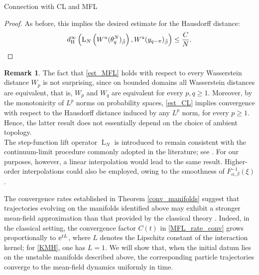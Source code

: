 \documentclass{article}
\theoremstyle{definition}
\newtheorem{rk}{Remark}[section]
\newcommand{\e}{\textnormal{e}}
\renewcommand{\u}{\textnormal{u}}
\renewcommand{\L}{\operatorname{L}}
\renewcommand{\H}{\operatorname{H}}
\begin{document}
\begin{section}{Connection with CL and MFL}
\begin{proof}
As before, this implies the desired estimate for the Hausdorff distance:
$$d_{\H}^{\infty}\left(\L_N\left(W^u(\theta^N_q)_{\Tilde{\beta}}\right),W^\u(y_{q-\pi})_{\Tilde{\beta}}\right)\leq\frac{C}{N}.$$
\end{proof}
\begin{rk} The fact that \eqref{est_MFL} holds with respect to every Wasserstein distance $W_p$ is not surprising, since on bounded domains all Wasserstein distances are equivalent, that is, $W_p$ and $W_q$ are equivalent for every $p,q\geq 1$. Moreover, by the monotonicity of $L^p$ norms on probability spaces, \eqref{est_CL} implies convergence with respect to the Hausdorff distance induced by any $L^p$ norm, for every $p\geq 1$. Hence, the latter result does not essentially depend on the choice of ambient topology.\\

The step-function lift operator $\operatorname{L}_N$ is introduced to remain consistent with the continuum-limit procedure commonly adopted in the literature; see \cite{medvedev2014nonlinear}. For our purposes, however, a linear interpolation would lead to the same result. Higher-order interpolations could also be employed, owing to the smoothness of $F^{-1}_{\alpha,\beta}(\xi)$.
\end{rk}
The convergence rates established in Theorem \ref{conv_manifolds} suggest that trajectories evolving on the manifolds identified above may exhibit a stronger mean-field approximation than that provided by the classical theory \cite{golse2016dynamics}. Indeed, in the classical setting, the convergence factor $C(t)$ in \eqref{MFL_rate_conv} grows proportionally to $\e^{tL}$, where $L$ denotes the Lipschitz constant of the interaction kernel; for \eqref{KMH}, one has $L=1$. We will show that, when the initial datum lies on the unstable manifolds described above, the corresponding particle trajectories converge to the mean-field dynamics uniformly in time.\\


\end{section}
\end{document}
